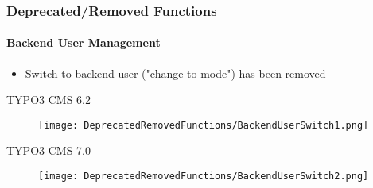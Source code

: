 \begin{frame}[fragile]
	\frametitle{Deprecated/Removed Functions}
	\framesubtitle{Backend User Management}

	\begin{itemize}
		\item Switch to backend user ("change-to mode") has been removed
	\end{itemize}

	\smaller\tabto{1cm}\begingroup\color{typo3red}TYPO3 CMS 6.2\endgroup\normalsize
	\begin{figure}\vspace{-0.4cm}
		\texttt{[image: DeprecatedRemovedFunctions/BackendUserSwitch1.png]}
	\end{figure}

	\smaller\tabto{1cm}\begingroup\color{typo3red}TYPO3 CMS 7.0\endgroup\normalsize
	\begin{figure}\vspace{-0.4cm}
		\texttt{[image: DeprecatedRemovedFunctions/BackendUserSwitch2.png]}
	\end{figure}

\end{frame}


